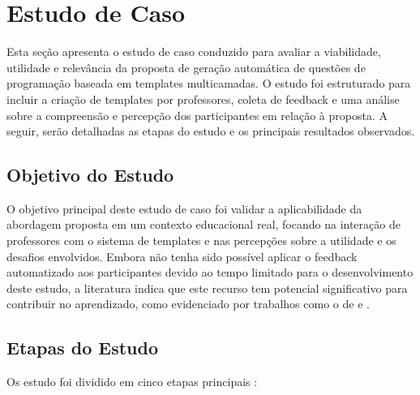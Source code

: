 \chapter{Estudo de Caso}

Esta seção apresenta o estudo de caso conduzido para avaliar a viabilidade, utilidade e relevância da proposta de geração automática de questões de programação baseada em templates multicamadas. O estudo foi estruturado para incluir a criação de templates por professores, coleta de feedback e uma análise sobre a compreensão e percepção dos participantes em relação à proposta. A seguir,  serão detalhadas as etapas do estudo e os principais resultados observados. 

\section{Objetivo do Estudo}
O objetivo principal deste estudo de caso foi validar a aplicabilidade da abordagem proposta em um contexto educacional real, focando na interação de professores com o sistema de templates e nas percepções sobre a utilidade e os desafios envolvidos. Embora não tenha sido possível aplicar o feedback automatizado aos participantes devido ao tempo limitado para o desenvolvimento deste estudo, a literatura  indica que este recurso tem potencial significativo para contribuir no aprendizado, como evidenciado por trabalhos como o de \parencite{vanpraet2024} e \parencite{fung2024}.


\section{Etapas do Estudo}

Os estudo foi dividido em cinco etapas principais : 

